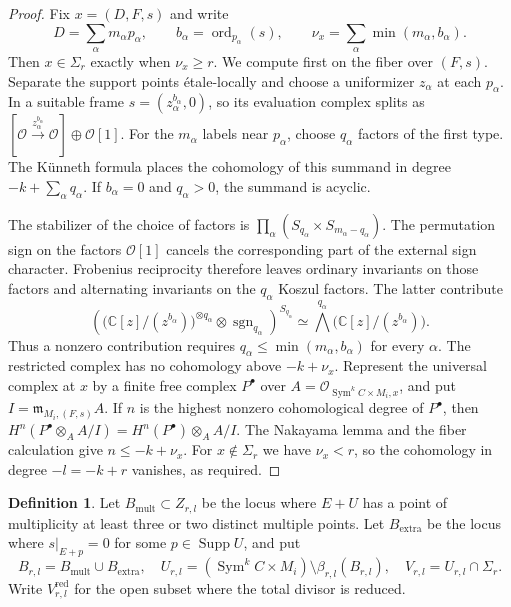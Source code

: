 \documentclass[11pt,letterpaper]{amsart}
\theoremstyle{plain}
\theoremstyle{definition}
\newtheorem{definition}[theorem]{Definition}
\theoremstyle{remark}
\numberwithin{equation}{section}
\DeclareMathOperator{\Sym}{Sym}
\begin{document}
\begin{proof}
Fix $x=(D,F,s)$ and write
\[
 D=\sum_\alpha m_\alpha p_\alpha,\qquad
 b_\alpha=\operatorname{ord}_{p_\alpha}(s),\qquad
 \nu_x=\sum_\alpha\min(m_\alpha,b_\alpha).
\]
Then $x\in\Sigma_r$ exactly when $\nu_x\ge r$.
We compute first on the fiber over $(F,s)$. Separate the support
points \'etale-locally and choose a uniformizer $z_\alpha$ at each
$p_\alpha$. In a suitable frame $s=(z_\alpha^{b_\alpha},0)$, so
its evaluation complex splits as
$[\mathcal O\xrightarrow{z_\alpha^{b_\alpha}}\mathcal O]
       \oplus\mathcal O[1]$.
For the $m_\alpha$ labels near $p_\alpha$, choose $q_\alpha$
factors of the first type. The K\"unneth formula places the
cohomology of this summand in degree $-k+\sum_\alpha q_\alpha$.
If $b_\alpha=0$ and $q_\alpha>0$, the summand is acyclic.

The stabilizer of the choice of factors is
$\prod_\alpha(S_{q_\alpha}\times S_{m_\alpha-q_\alpha})$.
The permutation sign on the factors $\mathcal O[1]$ cancels the
corresponding part of the external sign character. Frobenius
reciprocity therefore leaves ordinary invariants on those factors
and alternating invariants on the $q_\alpha$ Koszul factors.
The latter contribute
\[
 \left(\bigl(\mathbb C[z]/(z^{b_\alpha})\bigr)^{\otimes q_\alpha}
               \otimes\operatorname{sgn}_{q_\alpha}\right)^{S_{q_\alpha}}
 \simeq\bigwedge^{q_\alpha}\bigl(\mathbb C[z]/(z^{b_\alpha})\bigr).
\]
Thus a nonzero contribution requires
$q_\alpha\le\min(m_\alpha,b_\alpha)$ for every $\alpha$.
The restricted complex has no cohomology above $-k+\nu_x$.
Represent the universal complex at $x$ by a finite free complex
$P^\bullet$ over $A=\mathcal O_{\Sym^kC\times M_i,x}$, and put
$I=\mathfrak m_{M_i,(F,s)}A$. If $n$ is the highest nonzero
cohomological degree of $P^\bullet$, then
$
 H^n(P^\bullet\otimes_A A/I)=H^n(P^\bullet)\otimes_A A/I
$.
The Nakayama lemma and the fiber calculation give $n\le-k+\nu_x$.
For $x\notin\Sigma_r$ we have $\nu_x<r$, so the cohomology in
degree $-l=-k+r$ vanishes, as required.
\end{proof}




\begin{definition}
Let $B_{\mathrm{mult}}\subset Z_{r,l}$ be the locus where $E+U$ has a
point of multiplicity at least three or two distinct multiple points.
Let $B_{\mathrm{extra}}$ be the locus where $s|_{E+p}=0$ for some
$p\in\operatorname{Supp}U$, and put
\[
 B_{r,l}=B_{\mathrm{mult}}\cup B_{\mathrm{extra}},\quad
 U_{r,l}=(\Sym^kC\times M_i)\setminus\beta_{r,l}(B_{r,l}),\quad
 V_{r,l}=U_{r,l}\cap\Sigma_r.
\]
Write $V_{r,l}^{\mathrm{red}}$ for the open subset where the total
divisor is reduced.
\end{definition}
\end{document}

